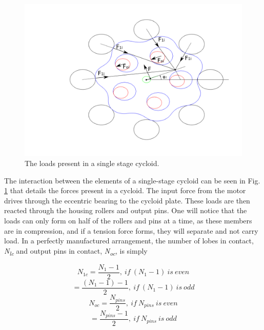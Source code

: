 \begin{figure}[t]
   \centering
   \includegraphics[width=01.0\linewidth]{fig/single_loads}
   \caption{The loads present in a single stage cycloid.}
   \label{fig:single_loads}
\end{figure}

The interaction between the elements of a single-stage cycloid can be seen in Fig. \ref{fig:single_loads} that details the forces present in a cycloid. The input force from the motor drives through the eccentric bearing to the cycloid plate. These loads are then reacted through the housing rollers and output pins. One will notice that the loads can only form on half of the rollers and pins at a time, as these members are in compression, and if a tension force forms, they will separate and not carry load. In a perfectly manufactured arrangement, the number of lobes in contact, \textit{N\textsubscript{lc}} and output pins in contact, \textit{N\textsubscript{oc}}, is simply 


\begin{equation}
N_{1c} = \frac{N_{1} - 1}{2},\ if\ (N_1 -1)\ is\ even 
\end{equation}
\begin{equation}
= \frac{(N_{1}-1) - 1}{2},\ if\ (N_{1} - 1)\ is\ odd 
\end{equation}
\begin{equation}
N_{oc} = \frac{N_{pins}}{2},\ if\ N_{pins}\ is\ even 
\end{equation}
\begin{equation}
= \frac{N_{pins} - 1}{2},\ if\ N_{pins}\ is\ odd 
\end{equation}

